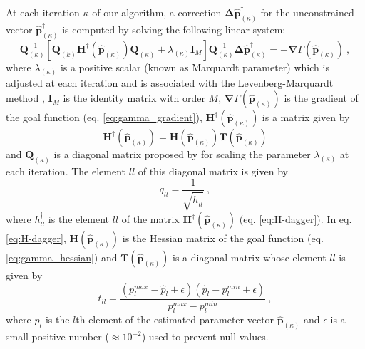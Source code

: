 At each iteration $\kappa$ of our algorithm, a correction 
$\boldsymbol{\Delta}\hat{\mathbf{p}}^{\dagger}_{(\kappa)}$ for the
unconstrained vector $\hat{\mathbf{p}}^{\dagger}_{(\kappa)}$
is computed by solving the following linear system:
\begin{equation}\label{eq:linear-system}
\mathbf{Q}_{(\kappa)}^{-1} \left[\mathbf{Q}_{(k)} \mathbf{H}^{\dagger}(\hat{\mathbf{p}}_{(\kappa)}) \mathbf{Q}_{(\kappa)} + \lambda_{(\kappa)} \mathbf{I}_{M} \right] 
\mathbf{Q}_{(\kappa)}^{-1} \boldsymbol{\Delta} \hat{\mathbf{p}}^{\dagger}_{(\kappa)} 
= -\boldsymbol{\nabla}\Gamma(\hat{\mathbf{p}}_{(\kappa)}) \: ,
\end{equation}
where $\lambda_{(\kappa)}$ is a positive scalar (known as Marquardt parameter) which is adjusted at each iteration and is associated with the Levenberg-Marquardt method \cite[e.g., ][ p. 240]{silva-2001,aster-etal2019},
$\mathbf{I}_{M}$ is the identity matrix with order $M$, 
$\boldsymbol{\nabla}\Gamma(\hat{\mathbf{p}}_{(\kappa)})$
is the gradient of the goal function (eq. \ref{eq:gamma_gradient}), 
$\mathbf{H}^{\dagger}(\hat{\mathbf{p}}_{(\kappa)})$ is a matrix given by
\begin{equation}\label{eq:H-dagger}
\mathbf{H}^{\dagger}(\hat{\mathbf{p}}_{(\kappa)}) = \mathbf{H}(\hat{\mathbf{p}}_{(\kappa)})\mathbf{T}(\hat{\mathbf{p}}_{(\kappa)}) 
\end{equation}
and $\mathbf{Q}_{(\kappa)}$ is a diagonal matrix proposed by \cite{marquardt_algorithm_1963} for scaling the parameter $\lambda_{(\kappa)}$ 
at each iteration.
The element $ll$ of this diagonal matrix is given by
\begin{equation}\label{eq:Q-matrix}
q_{ll} = \frac{1}{\sqrt{h^{\dagger}_{ll}}} \: ,
\end{equation}
where $h^{\dagger}_{ll}$ is the element $ll$ of the matrix $\mathbf{H}^{\dagger}(\hat{\mathbf{p}}_{(\kappa)})$ (eq. \ref{eq:H-dagger}). 
In eq. \ref{eq:H-dagger}, $\mathbf{H}(\hat{\mathbf{p}}_{(\kappa)})$ is the Hessian matrix of the goal function (eq. \ref{eq:gamma_hessian}) and $\mathbf{T}(\hat{\mathbf{p}}_{(\kappa)})$ is a diagonal matrix whose element $ll$ is given by
\begin{equation}\label{eq:inequality-diag}
t_{ll} = \frac{(p_{l}^{max} - \hat{p}_{l} + \epsilon)(\hat{p}_{l} - p_{l}^{min} + \epsilon)}{p_{l}^{max} - p_{l}^{min}} \: ,
\end{equation}
where $\hat{p}_{l}$ is the $l$th element of the estimated parameter vector 
$\hat{\mathbf{p}}_{(\kappa)}$ and $\epsilon$ is a small positive number 
($\approx 10^{-2}$) used to prevent null values.

